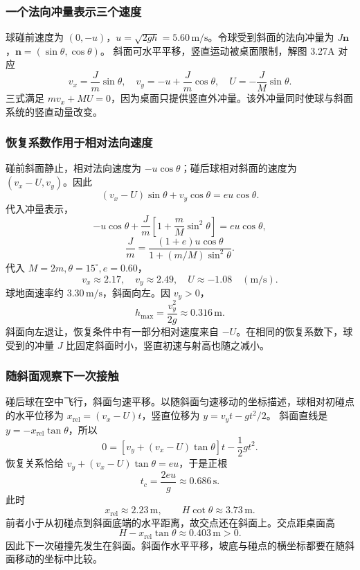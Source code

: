 \documentclass[UTF8,fontset=fandol,a4paper,11pt]{ctexart}
\newcommand{\vect}[1]{\bm{#1}}
\begin{document}
\subsubsection*{一个法向冲量表示三个速度}
球碰前速度为 $(0,-u)$，$u=\sqrt{2gh}=5.60\,\mathrm{m/s}$。令球受到斜面的法向冲量为 $J\vect n$，$\vect n=(\sin\theta,\cos\theta)$。
斜面可水平平移，竖直运动被桌面限制，解图 3.27A 对应
\[
v_x=\frac{J}{m}\sin\theta,\quad
v_y=-u+\frac{J}{m}\cos\theta,\quad
U=-\frac{J}{M}\sin\theta.
\]
三式满足 $mv_x+MU=0$，因为桌面只提供竖直外冲量。该外冲量同时使球与斜面系统的竖直动量改变。

\subsubsection*{恢复系数作用于相对法向速度}
碰前斜面静止，相对法向速度为 $-u\cos\theta$；碰后球相对斜面的速度为 $(v_x-U,v_y)$。因此
\[
(v_x-U)\sin\theta+v_y\cos\theta=eu\cos\theta.
\]
代入冲量表示，
\[
-u\cos\theta+\frac{J}{m}
\left[1+\frac mM\sin^2\theta\right]=eu\cos\theta,
\]
\[
\boxed{\frac{J}{m}
=\frac{(1+e)u\cos\theta}{1+(m/M)\sin^2\theta}}.
\]
代入 $M=2m,\theta=15^\circ,e=0.60$，
\[
\boxed{v_x\approx2.17,\quad v_y\approx2.49,\quad
U\approx-1.08\quad(\mathrm{m/s})}.
\]
球地面速率约 $3.30\,\mathrm{m/s}$，斜面向左。因 $v_y>0$，
\[
\boxed{h_{\max}=\frac{v_y^2}{2g}\approx0.316\,\mathrm m}.
\]
斜面向左退让，恢复条件中有一部分相对速度来自 $-U$。在相同的恢复系数下，球受到的冲量 $J$ 比固定斜面时小，竖直初速与射高也随之减小。

\subsubsection*{随斜面观察下一次接触}
碰后球在空中飞行，斜面匀速平移。以随斜面匀速移动的坐标描述，球相对初碰点的水平位移为
$x_{\mathrm{rel}}=(v_x-U)t$，竖直位移为 $y=v_yt-gt^2/2$。
斜面直线是 $y=-x_{\mathrm{rel}}\tan\theta$，所以
\[
0=[v_y+(v_x-U)\tan\theta]t-\frac12gt^2.
\]
恢复关系恰给 $v_y+(v_x-U)\tan\theta=eu$，于是正根
\[
t_c=\frac{2eu}{g}\approx0.686\,\mathrm s.
\]
此时
\[
x_{\mathrm{rel}}\approx2.23\,\mathrm m,\qquad
H\cot\theta\approx3.73\,\mathrm m.
\]
前者小于从初碰点到斜面底端的水平距离，故交点还在斜面上。交点距桌面高
\[
H-x_{\mathrm{rel}}\tan\theta\approx0.403\,\mathrm m>0.
\]
因此下一次碰撞先发生在斜面。斜面作水平平移，坡底与碰点的横坐标都要在随斜面移动的坐标中比较。
\end{document}
